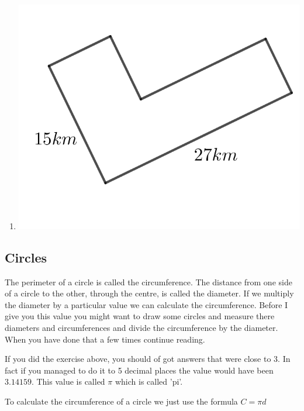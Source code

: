 \begin{multicols}{2}
\begin{enumerate}
	\item \includegraphics{./Images/Measurement/perimeter12.png}
\end{enumerate}
\end{multicols}
\subsection{Circles}
The perimeter of a circle is called the circumference.  The distance from one side of a circle to the other, through the centre, is called the diameter.  If we multiply the diameter by a particular value we can calculate the circumference.  Before I give you this value you might want to draw some circles and measure there diameters and circumferences and divide the circumference by the diameter.  When you have done that a few times continue reading.

\bigskip

If you did the exercise above, you should of got answers that were close to 3.  In fact if you managed to do it to 5 decimal places the value would have been $3.14159$.  This value is called $\pi$ which is called 'pi'.

\bigskip

To calculate the circumference of a circle we just use the formula $C=\pi d$

